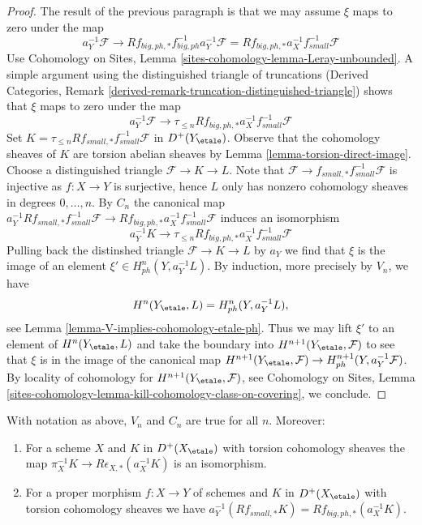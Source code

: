\begin{proof}
\medskip\noindent
The result of the previous paragraph is that we may assume
$\xi$ maps to zero under the map
$$
a_Y^{-1}\mathcal{F} \longrightarrow
Rf_{big, ph, *}f_{big, ph}^{-1}a_Y^{-1}\mathcal{F} =
Rf_{big, ph, *}a_X^{-1}f_{small}^{-1}\mathcal{F}
$$
Use Cohomology on Sites, Lemma \ref{sites-cohomology-lemma-Leray-unbounded}.
A simple argument using the distinguished triangle of truncations
(Derived Categories, Remark
\ref{derived-remark-truncation-distinguished-triangle}) shows that
$\xi$ maps to zero under the map
$$
a_Y^{-1}\mathcal{F} \longrightarrow
\tau_{\leq n}Rf_{big, ph, *}a_X^{-1}f_{small}^{-1}\mathcal{F}
$$
Set $K = \tau_{\leq n}Rf_{small, *}f_{small}^{-1}\mathcal{F}$
in $D^+(Y_\etale)$. Observe that the cohomology sheaves of $K$ are
torsion abelian sheaves by Lemma \ref{lemma-torsion-direct-image}.
Choose a distinguished triangle $\mathcal{F} \to K \to L$.
Note that $\mathcal{F} \to f_{small, *}f_{small}^{-1}\mathcal{F}$ is injective
as $f : X \to Y$ is surjective, hence $L$ only has nonzero
cohomology sheaves in degrees $0, \ldots, n$. By $C_n$ the canonical map
$a_Y^{-1}Rf_{small, *}f_{small}^{-1}\mathcal{F} \to
Rf_{big, ph, *}a_X^{-1}f_{small}^{-1}\mathcal{F}$
induces an isomorphism
$$
a_Y^{-1}K \longrightarrow
\tau_{\leq n}Rf_{big, ph, *}a_X^{-1}f_{small}^{-1}\mathcal{F}
$$
Pulling back the distinshed triangle $\mathcal{F} \to K \to L$
by $a_Y$ we find that $\xi$ is the image of an element
$\xi' \in H^n_{ph}(Y, a_Y^{-1}L)$.
By induction, more precisely by $V_n$, we have
$$
H^n(Y_\etale, L) = H^n_{ph}(Y, a_Y^{-1}L),
$$
see Lemma \ref{lemma-V-implies-cohomology-etale-ph}.
Thus we may lift $\xi'$ to an element of $H^n(Y_\etale, L)$
and take the boundary into $H^{n + 1}(Y_\etale, \mathcal{F})$
to see that $\xi$ is in the image of the canonical map
$H^{n + 1}(Y_\etale, \mathcal{F}) \to
H^{n + 1}_{ph}(Y, a_Y^{-1}\mathcal{F})$.
By locality of cohomology for $H^{n + 1}(Y_\etale, \mathcal{F})$, see
Cohomology on Sites, Lemma
\ref{sites-cohomology-lemma-kill-cohomology-class-on-covering},
we conclude.
\end{proof}

\begin{lemma}
\label{lemma-V-C-all-n-etale-ph}
With notation as above, $V_n$ and $C_n$ are true for all $n$. Moreover:
\begin{enumerate}
\item For a scheme $X$ and $K$ in $D^+(X_\etale)$ with torsion
cohomology sheaves the map
$\pi_X^{-1}K \to R\epsilon_{X, *}(a_X^{-1}K)$ is an isomorphism.
\item For a proper morphism $f : X \to Y$ of schemes
and $K$ in $D^+(X_\etale)$ with torsion cohomology sheaves we have
$a_Y^{-1}(Rf_{small, *}K) = Rf_{big, ph, *}(a_X^{-1}K)$.
\end{enumerate}
\end{lemma}

